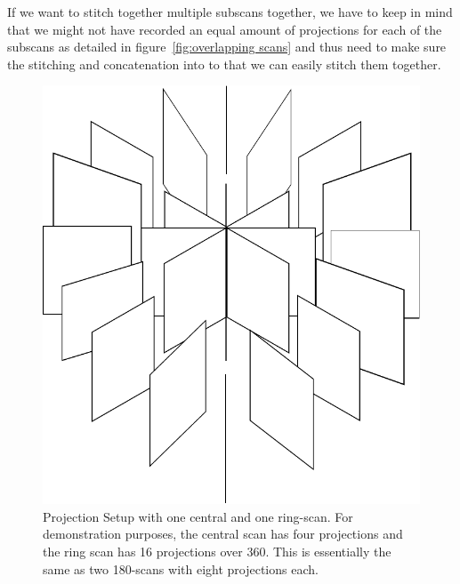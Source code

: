 If we want to stitch together multiple subscans together, we have to keep in mind that we might not have recorded an equal amount of projections for each of the subscans as detailed in figure~\ref{fig:overlapping scans} and thus need to make sure the stitching and concatenation into to that we can easily stitch them together.

\begin{figure}[tb]
	\centering
		\includegraphics[width=\imsize]{img/projections}
	\caption{Projection Setup with one central and one ring-scan. For demonstration purposes, the central scan has four projections and the ring scan has 16 projections over \unit{360}{\degree}. This is essentially the same as two \unit{180}{\degree}-scans with eight projections each.}
	\label{fig:projections}
\end{figure}